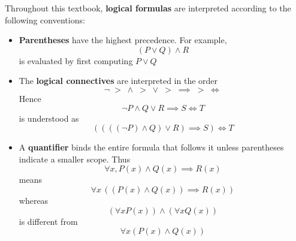 \begin{remark}
    Throughout this textbook, \textbf{logical formulas} are interpreted according to the following conventions:
    \begin{itemize}
        \item \textbf{Parentheses} have the highest precedence. For example,
        \[
        (P \lor Q) \land R
        \]
        is evaluated by first computing $P \lor Q$
        \item The \textbf{logical connectives} are interpreted in the order
        \[
        \neg \; > \; \land \; > \; \lor \; > \; \implies \; > \; \iff
        \]
        Hence
        \[
        \neg P \land Q \lor R \implies S \iff T
        \]
        is understood as
        \[
        ((((\neg P) \land Q) \lor R) \implies S) \iff T
        \]
        \item A \textbf{quantifier} binds the entire formula that follows it
        unless parentheses indicate a smaller scope. Thus
        \[
        \forall x, P(x) \land Q(x) \implies R(x)
        \]
        means
        \[
        \forall x\, ((P(x)\land Q(x))\implies R(x))
        \]
        whereas
        \[
        (\forall x P(x)) \land (\forall x Q(x))
        \]
        is different from
        \[
        \forall x (P(x) \land Q(x))
        \]
    \end{itemize}
\end{remark}

